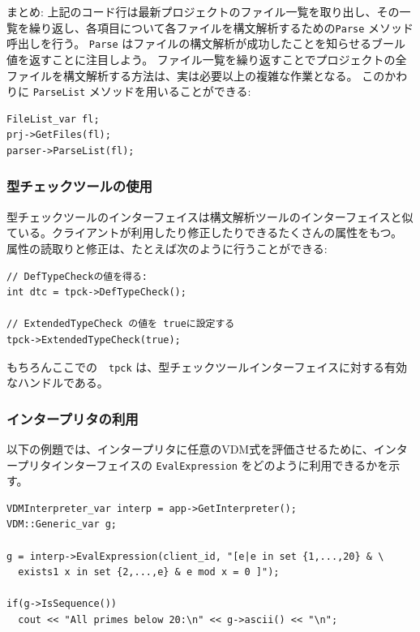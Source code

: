 \documentclass[\pformat,12pt]{jarticle}
\begin{document}
まとめ: 上記のコード行は最新プロジェクトのファイル一覧を取り出し、その一覧を繰り返し、各項目について各ファイルを構文解析するための{\tt Parse} メソッド呼出しを行う。
 {\tt Parse} はファイルの構文解析が成功したことを知らせるブール値を返すことに注目しよう。
ファイル一覧を繰り返すことでプロジェクトの全ファイルを構文解析する方法は、実は必要以上の複雑な作業となる。
このかわりに {\tt ParseList} メソッドを用いることができる:

\begin{verbatim}
FileList_var fl;
prj->GetFiles(fl);
parser->ParseList(fl);
\end{verbatim}

\subsubsection{型チェックツールの使用}
\label{usingthetypechecker}

型チェックツールのインターフェイスは構文解析ツールのインターフェイスと似ている。クライアントが利用したり修正したりできるたくさんの属性をもつ。 
属性の読取りと修正は、たとえば次のように行うことができる: 

\begin{verbatim}
// DefTypeCheckの値を得る:
int dtc = tpck->DefTypeCheck();

// ExtendedTypeCheck の値を trueに設定する
tpck->ExtendedTypeCheck(true);
\end{verbatim}

もちろんここでの　\texttt{tpck} は、型チェックツールインターフェイスに対する有効なハンドルである。

\subsubsection{インタープリタの利用}\label{cpp:interp}
\label{usingtheinterpreter}

以下の例題では、インタープリタに任意のVDM式を評価させるために、インタープリタインターフェイスの {\tt EvalExpression} をどのように利用できるかを示す。

\begin{verbatim}
VDMInterpreter_var interp = app->GetInterpreter();
VDM::Generic_var g;

g = interp->EvalExpression(client_id, "[e|e in set {1,...,20} & \
  exists1 x in set {2,...,e} & e mod x = 0 ]");

if(g->IsSequence())
  cout << "All primes below 20:\n" << g->ascii() << "\n";
\end{verbatim}
\end{document}
